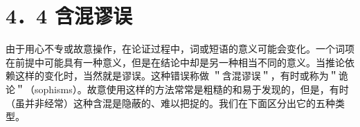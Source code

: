 \section*{4．4 含混谬误}
由于用心不专或故意操作，在论证过程中，词或短语的意义可能会变化。一个词项在前提中可能具有一种意义，但是在结论中却是另一种相当不同的意义。当推论依赖这样的变化时，当然就是谬误。这种错误称做 ＂含混谬误＂，有时或称为＂诡论＂（sophisms）。故意使用这样的方法常常是粗糙的和易于发现的，但是，有时（虽并非经常）这种含混是隐蔽的、难以把捉的。我们在下面区分出它的五种类型。 